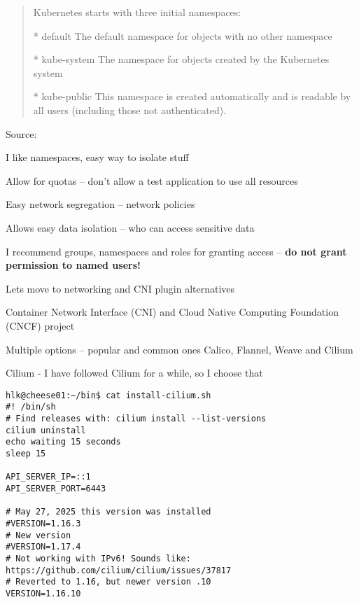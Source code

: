 \documentclass[Screen16to9,17pt]{foils}
\begin{document}

\begin{quote}
Kubernetes starts with three initial namespaces:
\begin{list2}
\item[*] default The default namespace for objects with no other namespace
\item[*] kube-system The namespace for objects created by the Kubernetes system
\item[*] kube-public This namespace is created automatically and is readable by all users (including those not authenticated).
\end{list2}
\end{quote}
Source: 

\begin{list2}
\item I like namespaces, easy way to isolate stuff
\item Allow for quotas -- don't allow a test application to use all resources
\item Easy network segregation -- network policies
\item Allows easy data isolation -- who can access sensitive data
\item I recommend groups, namespaces and roles for granting access -- {\bf do not grant permission to named users!}
\end{list2}



Lets move to networking and CNI plugin alternatives

\begin{list2}
\item Container Network Interface (CNI) and Cloud Native Computing Foundation (CNCF) project\\
\item Multiple options -- popular and common ones Calico, Flannel, Weave and Cilium
\item Cilium - I have followed Cilium for a while, so I choose that
\end{list2}



\begin{verbatim}
hlk@cheese01:~/bin$ cat install-cilium.sh
#! /bin/sh
# Find releases with: cilium install --list-versions
cilium uninstall
echo waiting 15 seconds
sleep 15

API_SERVER_IP=::1
API_SERVER_PORT=6443

# May 27, 2025 this version was installed
#VERSION=1.16.3
# New version
#VERSION=1.17.4
# Not working with IPv6! Sounds like: https://github.com/cilium/cilium/issues/37817
# Reverted to 1.16, but newer version .10
VERSION=1.16.10
\end{verbatim}
\end{document}
